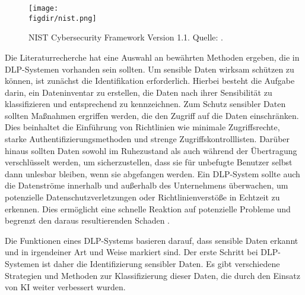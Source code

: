 \begin{figure}[htbp]
    \centering
    \texttt{[image: \\figdir/nist.png]}
    \caption{NIST Cybersecurity Framework Version 1.1. Quelle: \cite{NIST.2014}.}
    \label{f:nist}
\end{figure}

Die Literaturrecherche hat eine Auswahl an bewährten Methoden ergeben, die in DLP-Systemen vorhanden sein sollten. Um sensible Daten wirksam schützen zu können, ist zunächst die Identifikation erforderlich. Hierbei besteht die Aufgabe darin, ein Dateninventar zu erstellen, die Daten nach ihrer Sensibilität zu klassifizieren und entsprechend zu kennzeichnen. Zum Schutz sensibler Daten sollten Maßnahmen ergriffen werden, die den Zugriff auf die Daten einschränken. Dies beinhaltet die Einführung von Richtlinien wie minimale Zugriffsrechte, starke Authentifizierungsmethoden und strenge Zugriffskontrolllisten. Darüber hinaus sollten Daten sowohl im Ruhezustand als auch während der Übertragung verschlüsselt werden, um sicherzustellen, dass sie für unbefugte Benutzer selbst dann unlesbar bleiben, wenn sie abgefangen werden. Ein DLP-System sollte auch die Datenströme innerhalb und außerhalb des Unternehmens überwachen, um potenzielle Datenschutzverletzungen oder Richtlinienverstöße in Echtzeit zu erkennen. Dies ermöglicht eine schnelle Reaktion auf potenzielle Probleme und begrenzt den daraus resultierenden Schaden \cite{HerreraMontano.2022}\cite{Shishodia.2022}. %

Die Funktionen eines DLP-Systems basieren darauf, dass sensible Daten erkannt und in irgendeiner Art und Weise markiert sind. Der erste Schritt bei DLP-Systemen ist daher die Identifizierung sensibler Daten. Es gibt verschiedene Strategien und Methoden zur Klassifizierung dieser Daten, die durch den Einsatz von KI weiter verbessert wurden.

